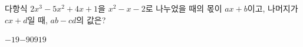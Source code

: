 다항식 $2x^3-5x^2+4x+1$을 $x^2-x-2$로 나누었을 때의 몫이 $ax+b$이고, 나머지가 $cx+d$일 때, $ab-cd$의 값은? 
\begin{choices32}{$-19$}{$-9$}{$0$}{$9$}{$19$}\end{choices32}
